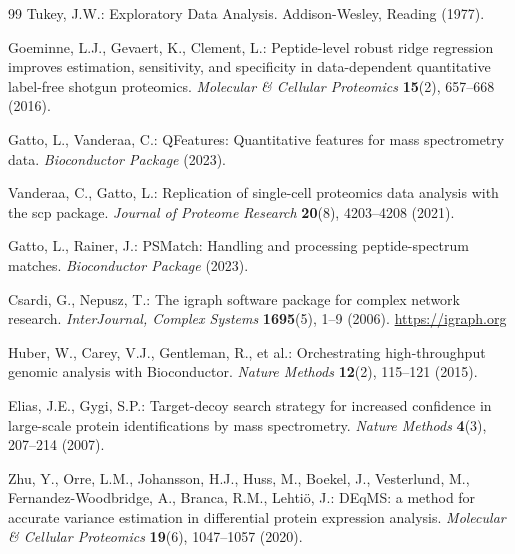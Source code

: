 \documentclass[11pt,twoside,openright]{book}
\begin{document}
\begin{thebibliography}{99}
Tukey, J.W.: Exploratory Data Analysis.
Addison-Wesley, Reading (1977).

Goeminne, L.J., Gevaert, K., Clement, L.: Peptide-level robust ridge regression improves estimation, sensitivity, and specificity in data-dependent quantitative label-free shotgun proteomics.
\textit{Molecular \& Cellular Proteomics} \textbf{15}(2), 657--668 (2016).

Gatto, L., Vanderaa, C.: QFeatures: Quantitative features for mass spectrometry data.
\textit{Bioconductor Package} (2023).

Vanderaa, C., Gatto, L.: Replication of single-cell proteomics data analysis with the scp package.
\textit{Journal of Proteome Research} \textbf{20}(8), 4203--4208 (2021).

Gatto, L., Rainer, J.: PSMatch: Handling and processing peptide-spectrum matches.
\textit{Bioconductor Package} (2023).

Csardi, G., Nepusz, T.: The igraph software package for complex network research.
\textit{InterJournal, Complex Systems} \textbf{1695}(5), 1--9 (2006).
\url{https://igraph.org}

Huber, W., Carey, V.J., Gentleman, R., et al.: Orchestrating high-throughput genomic analysis with Bioconductor.
\textit{Nature Methods} \textbf{12}(2), 115--121 (2015).

Elias, J.E., Gygi, S.P.: Target-decoy search strategy for increased confidence in large-scale protein identifications by mass spectrometry.
\textit{Nature Methods} \textbf{4}(3), 207--214 (2007).

Zhu, Y., Orre, L.M., Johansson, H.J., Huss, M., Boekel, J., Vesterlund, M., Fernandez-Woodbridge, A., Branca, R.M., Lehti{\"o}, J.: DEqMS: a method for accurate variance estimation in differential protein expression analysis.
\textit{Molecular \& Cellular Proteomics} \textbf{19}(6), 1047--1057 (2020).

\end{thebibliography}
\end{document}
